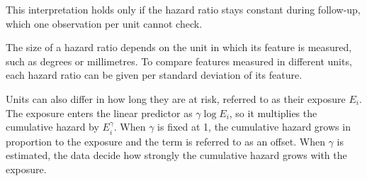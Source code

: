This interpretation holds only if the hazard ratio stays constant during follow-up, which one observation per
unit cannot check.

The size of a hazard ratio depends on the unit in which its feature is measured, such as degrees or
millimetres. To compare features measured in different units, each hazard ratio can be given per
standard deviation of its feature.

Units can also differ in how long they are at risk, referred to as their exposure $E_i$. The exposure
enters the linear predictor as $\gamma \log E_i$, so it multiplies the cumulative hazard by
$E_i^{\gamma}$. When $\gamma$ is fixed at 1, the cumulative hazard grows in proportion to the exposure
and the term is referred to as an offset. When $\gamma$ is estimated, the data decide how strongly the
cumulative hazard grows with the exposure.
